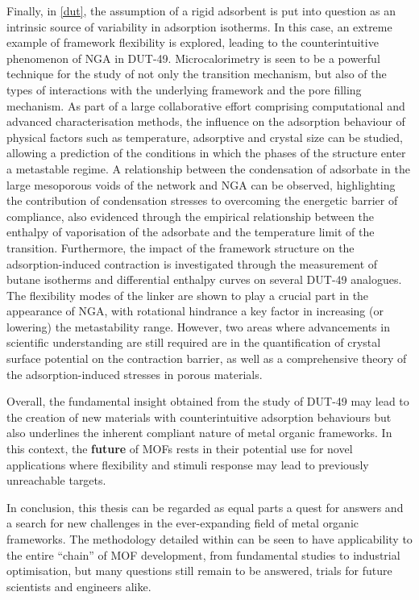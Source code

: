 Finally, in \autoref{dut}, the assumption of a rigid adsorbent 
is put into question as an intrinsic source of variability in adsorption
isotherms. In this case, an extreme example of framework flexibility
is explored, leading to the counterintuitive phenomenon of \gls{NGA}
in DUT-49.
Microcalorimetry is seen to be a powerful technique for the study
of not only the transition mechanism, but also of the types of
interactions with the underlying framework and the pore filling
mechanism. As part of a large collaborative effort comprising
computational and advanced characterisation methods, the
influence on the adsorption behaviour of physical factors such
as temperature, adsorptive and crystal size can be studied, allowing
a prediction of the conditions in which the phases of the structure
enter a metastable regime. A relationship between the condensation 
of adsorbate in the large mesoporous voids of the network and \gls{NGA}
can be observed, highlighting the contribution of condensation 
stresses to overcoming the energetic barrier of compliance, also 
evidenced through the empirical relationship between the enthalpy
of vaporisation of the adsorbate and the temperature limit 
of the transition. Furthermore, the impact of the framework
structure on the adsorption-induced contraction is investigated
through the measurement of butane isotherms and differential enthalpy
curves on several DUT-49 analogues. The flexibility modes of the 
linker are shown to play a crucial part in the appearance of 
\gls{NGA}, with rotational hindrance a key factor in increasing
(or lowering) the metastability range. However, two areas where 
advancements in scientific understanding are still required are 
in the quantification of crystal surface potential on the contraction
barrier, as well as a comprehensive theory of the adsorption-induced
stresses in porous materials.

Overall, the fundamental insight obtained from the study of 
DUT-49 may lead to the creation of new materials with counterintuitive
adsorption behaviours but also underlines the inherent compliant
nature of metal organic frameworks. In this context, the 
\textbf{future} of \glspl{MOF} rests in their potential use for
novel applications where flexibility and stimuli response may
lead to previously unreachable targets.

In conclusion, this thesis can be regarded as equal parts a quest for
answers and a search for new challenges in the ever-expanding 
field of metal organic frameworks. The methodology detailed within
can be seen to have applicability to the entire ``chain'' of
\gls{MOF} development, from fundamental studies to industrial optimisation,
but many questions still remain to be answered, trials for future
scientists and engineers alike.

\pagebreak

